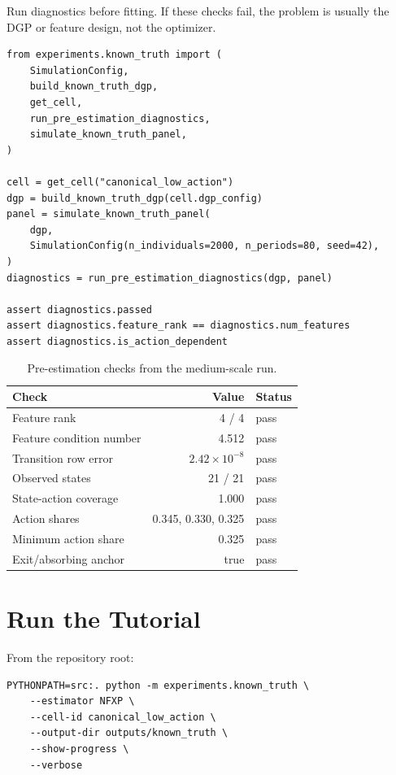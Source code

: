 \documentclass[10pt]{article}
\begin{document}
Run diagnostics before fitting. If these checks fail, the problem is usually
the DGP or feature design, not the optimizer.

\begin{lstlisting}
from experiments.known_truth import (
    SimulationConfig,
    build_known_truth_dgp,
    get_cell,
    run_pre_estimation_diagnostics,
    simulate_known_truth_panel,
)

cell = get_cell("canonical_low_action")
dgp = build_known_truth_dgp(cell.dgp_config)
panel = simulate_known_truth_panel(
    dgp,
    SimulationConfig(n_individuals=2000, n_periods=80, seed=42),
)
diagnostics = run_pre_estimation_diagnostics(dgp, panel)

assert diagnostics.passed
assert diagnostics.feature_rank == diagnostics.num_features
assert diagnostics.is_action_dependent
\end{lstlisting}

\begin{table}[H]
\centering\small
\caption{Pre-estimation checks from the medium-scale run.}
\begin{tabular}{lrl}
\toprule
Check & Value & Status \\
\midrule
Feature rank & 4 / 4 & pass \\
Feature condition number & 4.512 & pass \\
Transition row error & $2.42\times 10^{-8}$ & pass \\
Observed states & 21 / 21 & pass \\
State-action coverage & 1.000 & pass \\
Action shares & 0.345, 0.330, 0.325 & pass \\
Minimum action share & 0.325 & pass \\
Exit/absorbing anchor & true & pass \\
\bottomrule
\end{tabular}
\end{table}

\section{Run the Tutorial}

From the repository root:

\begin{lstlisting}
PYTHONPATH=src:. python -m experiments.known_truth \
    --estimator NFXP \
    --cell-id canonical_low_action \
    --output-dir outputs/known_truth \
    --show-progress \
    --verbose
\end{lstlisting}
\end{document}
